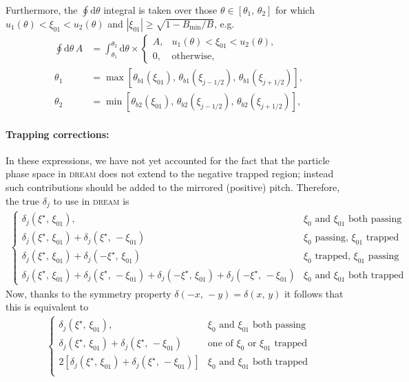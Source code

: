 \documentclass[11pt,a4paper]{article}
\newcommand{\rd}{\ensuremath{\mathrm{d}}}
\newcommand{\sub}[1]{\ensuremath{_{\text{#1}}}}
\begin{document}
Furthermore, the $\oint \rd \theta$ integral is taken over those $\theta \in [\theta_1, \, \theta_2]$  for which $u_1(\theta) < \xi_{01} < u_2(\theta)$ and $|\xi_{01}| \geq \sqrt{1 - B\sub{min}/B}$, e.g.
\begin{align}
\oint \rd \theta \,A &= \int_{\theta_1}^{\theta_2}\rd \theta  \times\begin{cases}
A, & u_1(\theta) < \xi_{01} < u_2(\theta), \\
0, & \mathrm{otherwise}, 
\end{cases}\nonumber \\
\theta_1 &= \max\left[\theta_{b1}(\xi_{01}),\,\theta_{b1}(\xi_{j-1/2}),\,\theta_{b1}(\xi_{j+1/2})\right],
\nonumber \\
\theta_2 &= \min\left[\theta_{b2}(\xi_{01}),\, \theta_{b2}(\xi_{j-1/2}),\,\theta_{b2}(\xi_{j+1/2})\right], \nonumber
\end{align}

\paragraph{Trapping corrections:}
In these expressions, we have not yet accounted for the fact that the particle phase space in \textsc{dream} does not extend to the negative trapped region; instead such contributions should be added to the mirrored (positive) pitch. Therefore, the true $\delta_j$ to use in \textsc{dream} is
\begin{align}
\begin{cases}
\delta_j(\xi^\star,\,\xi_{01}), & \text{$\xi_0$ and $\xi_{01}$ both passing} \\
\delta_j(\xi^\star,\,\xi_{01}) + \delta_j(\xi^\star,\,-\xi_{01})& \text{$\xi_0$ passing, $\xi_{01}$ trapped}\\
\delta_j(\xi^\star,\,\xi_{01}) + \delta_j(-\xi^\star,\,\xi_{01})& \text{$\xi_0$ trapped, $\xi_{01}$ passing}\\
\delta_j(\xi^\star,\,\xi_{01}) + \delta_j(\xi^\star,\,-\xi_{01})+ \delta_j(-\xi^\star,\,\xi_{01})+ \delta_j(-\xi^\star,\,-\xi_{01})& \text{$\xi_0$ and $\xi_{01}$ both trapped}
\end{cases}
\end{align}
Now, thanks to the symmetry property $\delta(-x,\,-y) = \delta(x,\,y)$ it follows that this is equivalent to
\begin{align}
\begin{cases}
\delta_j(\xi^\star,\,\xi_{01}), & \text{$\xi_0$ and $\xi_{01}$ both passing} \\
\delta_j(\xi^\star,\,\xi_{01}) + \delta_j(\xi^\star,\,-\xi_{01})& \text{one of $\xi_0$ or $\xi_{01}$ trapped}\\
2\left[\delta_j(\xi^\star,\,\xi_{01}) + \delta_j(\xi^\star,\,-\xi_{01})\right]&\text{$\xi_0$ and $\xi_{01}$ both trapped}\\
\end{cases}
\end{align}
\end{document}
